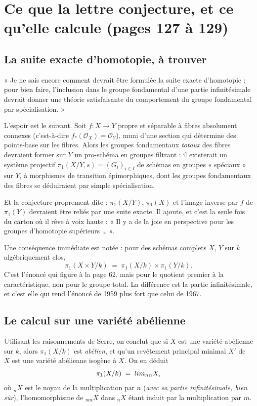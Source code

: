 \documentclass[11pt,a4paper]{article}
\begin{document}
\section*{Ce que la lettre conjecture, et ce qu'elle calcule (pages 127 à 129)}

\subsection*{La suite exacte d'homotopie, à trouver}

« Je ne sais encore comment devrait être formulée la suite exacte d'homotopie ;
pour bien faire, l'inclusion dans le groupe fondamental d'une partie
infinitésimale devrait donner une théorie satisfaisante du comportement du
groupe fondamental par spécialisation. »

L'espoir est le suivant. Soit $f : X \to Y$ propre et séparable à fibres
absolument connexes (c'est-à-dire $f_{*}(\mathcal{O}_{X}) = \mathcal{O}_{Y}$),
muni d'une section qui détermine des points-base sur les fibres. Alors les
groupes fondamentaux \emph{totaux} des fibres devraient former sur $Y$ un
pro-schéma en groupes filtrant : il existerait un système projectif
$\pi_{1}(X/Y, s) = (G_{i})_{i \in I}$ de schémas en groupes « spéciaux » sur
$Y$, à morphismes de transition épimorphiques, dont les groupes fondamentaux
des fibres se déduiraient par simple spécialisation.

Et la conjecture proprement dite : $\pi_{1}(X/Y)$, $\pi_{1}(X)$ et l'image
inverse par $f$ de $\pi_{1}(Y)$ devraient être reliés par une suite exacte.
Il ajoute, et c'est la seule fois du carton où il rêve à voix haute :
« Il y a de la joie en perspective pour les groupes d'homotopie supérieurs
… ».

Une conséquence immédiate est notée : pour des schémas complets $X$, $Y$ sur
$k$ algébriquement clos,
\[
  \pi_{1}(X \times Y/k) \;=\; \pi_{1}(X/k) \times \pi_{1}(Y/k) .
\]
C'est l'énoncé qui figure à la page 62, mais pour le quotient
premier à la caractéristique, non pour le groupe total. La différence est
la partie infinitésimale, et c'est elle qui rend l'énoncé de 1959
plus fort que celui de 1967.

\subsection*{Le calcul sur une variété abélienne}

Utilisant les raisonnements de Serre, on conclut que si $X$ est une variété
abélienne sur $k$, alors $\pi_{1}(X/k)$ est \emph{abélien}, et qu'un revêtement
principal minimal $X'$ de $X$ est une variété abélienne isogène à $X$. On en
déduit
\[
  \pi_{1}(X/k) \;=\; \varprojlim_{n} {}_{n}X ,
\]
où ${}_{n}X$ est le noyau de la multiplication par $n$ (\emph{avec sa partie
infinitésimale, bien sûr}), l'homomorphisme de ${}_{mn}X$ dans ${}_{n}X$
étant induit par la multiplication par $m$.
\end{document}
